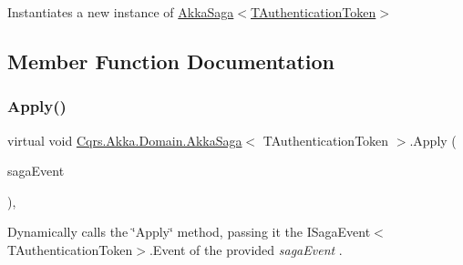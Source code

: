 Instantiates a new instance of \hyperlink{classCqrs_1_1Akka_1_1Domain_1_1AkkaSaga_a2f0ebb5d1d22e3112d5b9a09fde7fb47_a2f0ebb5d1d22e3112d5b9a09fde7fb47}{Akka\+Saga$<$\+T\+Authentication\+Token$>$} 



\subsection{Member Function Documentation}
\mbox{\label{classCqrs_1_1Akka_1_1Domain_1_1AkkaSaga_a4a12310825f2d2cc5963eee4cc4ed802_a4a12310825f2d2cc5963eee4cc4ed802}} 
\subsubsection{\texorpdfstring{Apply()}{Apply()}}
{\footnotesize\ttfamily virtual void \hyperlink{classCqrs_1_1Akka_1_1Domain_1_1AkkaSaga}{Cqrs.\+Akka.\+Domain.\+Akka\+Saga}$<$ T\+Authentication\+Token $>$.Apply (\begin{DoxyParamCaption}\item[{\hyperlink{interfaceCqrs_1_1Events_1_1ISagaEvent}{I\+Saga\+Event}$<$ T\+Authentication\+Token $>$}]{saga\+Event }\end{DoxyParamCaption})\hspace{0.3cm}{\ttfamily [protected]}, {\ttfamily [virtual]}}



Dynamically calls the \char`\"{}\+Apply\char`\"{} method, passing it the I\+Saga\+Event$<$\+T\+Authentication\+Token$>$.\+Event of the provided {\itshape saga\+Event} . 

\mbox{\label{classCqrs_1_1Akka_1_1Domain_1_1AkkaSaga_a42126a6a1a7896d16412b6023f208f7c_a42126a6a1a7896d16412b6023f208f7c}} 
